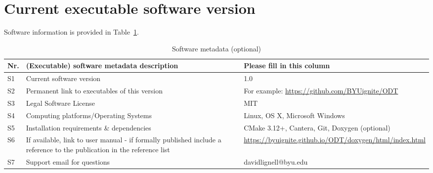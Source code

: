 \documentclass[preprint,12pt, a4paper]{elsarticle}
\begin{document}

 
 

\section*{Current executable software version}
\label{software_version}

Software information is provided in Table~\ref{t:software}.


\begin{table}[!h]
\begin{tabular}{|l|p{6.5cm}|p{6.5cm}|}
\hline
\textbf{Nr.} & \textbf{(Executable) software metadata description} & \textbf{Please fill in this column} \\
\hline
S1 & Current software version & 1.0 \\
\hline
S2 & Permanent link to executables of this version  & For example: \href{https://github.com/BYUignite/ODT}{https://github.com/BYUignite/ODT} \\
\hline
S3 & Legal Software License & MIT \\
\hline
S4 & Computing platforms/Operating Systems & Linux, OS X, Microsoft Windows\\
\hline
S5 & Installation requirements \& dependencies & CMake 3.12+, Cantera, Git, Doxygen (optional) \\
\hline
S6 & If available, link to user manual - if formally published include a reference to the publication in the reference list & \href{https://byuignite.github.io/ODT/doxygen/html/index.html}{https://byuignite.github.io/ODT/doxygen/html/index.html}\\
\hline
S7 & Support email for questions & davidlignell@byu.edu \\
\hline
\end{tabular}
\caption{Software metadata (optional)}
\label{t:software}
\end{table}
\end{document}
